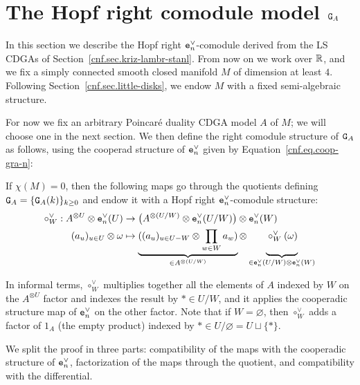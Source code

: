\section{The Hopf right comodule model \texorpdfstring{$\mathtt{G}_{A}$}{G\_A}}
\label{cnf.sec.model}

In this section we describe the Hopf right $\mathtt{e}_{n}^{\vee}$-comodule derived from the LS CDGAs of Section~\ref{cnf.sec.kriz-lambr-stanl}.
From now on we work over $\mathbb{R}$, and we fix a simply connected smooth closed manifold $M$ of dimension at least $4$.
Following Section~\ref{cnf.sec.little-disks}, we endow $M$ with a fixed semi-algebraic structure.

For now we fix an arbitrary Poincaré duality CDGA model $A$ of $M$; we will choose one in the next section.
We then define the right comodule structure of $\mathtt{G}_{A}$ as follows, using the cooperad structure of $\mathtt{e}_{n}^{\vee}$ given by Equation~\eqref{cnf.eq.coop-gra-n}:

\begin{proposition}
  \label{cnf.prop.comodule-eA}
  If $\chi(M) = 0$, then the following maps go through the quotients defining $\mathtt{G}_{A} = \{ \mathtt{G}_{A}(k) \}_{k \geq 0}$ and endow it with a Hopf right $\mathtt{e}_{n}^{\vee}$-comodule structure:
  \begin{align}
    \circ_{W}^{\vee} : A^{\otimes U} \otimes \enV(U)
    & \to \bigl( A^{\otimes (U/W)} \otimes \enV(U/W) \bigr) \otimes \enV(W)
    \notag \\
    (a_{u})_{u \in U} \otimes \omega
    & \mapsto
      \underbrace{ ((a_{u})_{u \in U - W} \otimes \prod_{w \in W} a_{w}) }_{\in A^{\otimes (U/W)}}
      \otimes
      \underbrace{ \vphantom{\prod_{w \in W}} \circ_{W}^{\vee}(\omega) }_{\in \enV(U/W) \otimes \enV(W)}
      \label{cnf.eq.comodule}
  \end{align}
\end{proposition}

In informal terms, $\circ_{W}^{\vee}$ multiplies together all the elements of $A$ indexed by $W$ on the $A^{\otimes U}$ factor and indexes the result by $* \in U/W$, and it applies the cooperadic structure map of $\mathtt{e}_{n}^{\vee}$ on the other factor.
Note that if $W = \varnothing$, then $\circ_{W}^{\vee}$ adds a factor of $1_{A}$ (the empty product) indexed by $* \in U/\varnothing = U \sqcup \{*\}$.

We split the proof in three parts: compatibility of the maps with the cooperadic structure of $\mathtt{e}_{n}^{\vee}$, factorization of the maps through the quotient, and compatibility with the differential.

